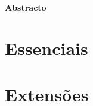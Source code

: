 \documentclass[usletter,11pt,english,oneside,onecolumn,final,openany]{report}
\begin{document}
\newpage
\pagestyle{empty}
\vspace{0.5cm}
\begin{center} 
\begin{minipage}{5.5in}
\begin{center}
\vspace*{\fill}%
{\LARGE \bfseries  Abstracto}
\end{center}
\begin{center} \vrule width 4.5in height 0.4pt \end{center} 
\parindent=0pt 

\begin{center} \vrule width 4.5in height 0.4pt \end{center} 
\end{minipage} 
\vspace*{\fill}
\end{center}

\newpage
\pagestyle{plain}
\tableofcontents

%

\newpage
{}
\pagestyle{fancy}




\part{Essenciais}







\part{Extensões}





%


{\footnotesize


}


\addappheadtotoc
\appendixpage


\end{document}
